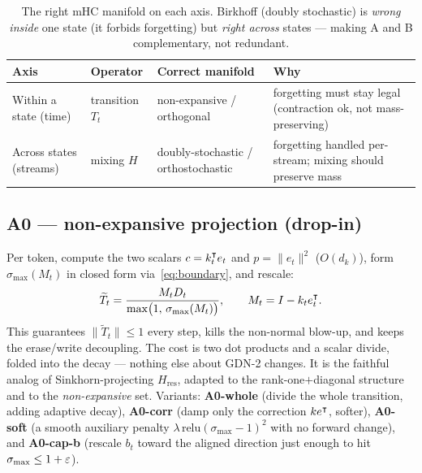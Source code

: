 \documentclass[11pt,letterpaper,logo]{yalearxiv}
\newcommand{\smax}{\sigma_{\max}}
\newcommand{\Tcarry}{T}          %
\newcommand{\Hres}{H_{\mathrm{res}}}
\begin{document}
\begin{table}[t]
\centering
\small
\begin{tabular}{@{}llll@{}}
\toprule
Axis & Operator & Correct manifold & Why \\
\midrule
Within a state (time) & transition $\Tcarry_t$ & non-expansive / orthogonal &
forgetting must stay legal (contraction ok, not mass-preserving) \\
Across states (streams) & mixing $H$ & doubly-stochastic / orthostochastic &
forgetting handled per-stream; mixing should preserve mass \\
\bottomrule
\end{tabular}
\caption{The right mHC manifold on each axis. Birkhoff (doubly stochastic) is
\emph{wrong inside} one state (it forbids forgetting) but \emph{right across}
states --- making A and B complementary, not redundant.}
\label{tab:manifolds}
\end{table}

\subsection{A0 --- non-expansive projection (drop-in)}
Per token, compute the two scalars $c = k_t^{\intercal} e_t$ and $p = \|e_t\|^2$ ($O(d_k)$),
form $\smax(M_t)$ in closed form via~\eqref{eq:boundary}, and rescale:
\begin{equation}
  \widetilde{\Tcarry}_t = \frac{M_t D_t}{\max\!\big(1,\, \smax(M_t)\big)},
  \qquad M_t = I - k_t e_t^{\tr}.
  \label{eq:a0}
\end{equation}
This guarantees $\|\widetilde{\Tcarry}_t\| \le 1$ every step, kills the non-normal
blow-up, and keeps the erase/write decoupling. The cost is two dot products and a
scalar divide, folded into the decay --- nothing else about GDN-2 changes. It is the
faithful analog of Sinkhorn-projecting $\Hres$, adapted to the rank-one$+$diagonal
structure and to the \emph{non-expansive} set. Variants: \textbf{A0-whole} (divide the
whole transition, adding adaptive decay), \textbf{A0-corr} (damp only the correction
$k e^{\intercal}$, softer), \textbf{A0-soft} (a smooth auxiliary penalty
$\lambda\,\mathrm{relu}(\smax-1)^2$ with no forward change), and \textbf{A0-cap-b}
(rescale $b_t$ toward the aligned direction just enough to hit $\smax \le 1+\eps$).
\end{document}
